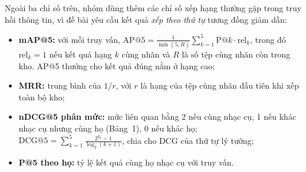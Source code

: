 
Ngoài ba chỉ số trên, nhóm dùng thêm các chỉ số xếp hạng thường gặp trong truy hồi thông tin, vì đề bài yêu cầu kết quả \emph{xếp theo thứ tự} tương đồng giảm dần:
\begin{itemize}
\item \textbf{mAP@5:} với mỗi truy vấn, $\mathrm{AP@5}=\frac{1}{\min(5,R)}\sum_{k=1}^{5}\mathrm{P@}k\cdot \mathrm{rel}_k$, trong đó $\mathrm{rel}_k=1$ nếu kết quả hạng $k$ cùng nhãn và $R$ là số tệp cùng nhãn còn trong kho. AP@5 thưởng cho kết quả đúng nằm ở hạng cao;
\item \textbf{MRR:} trung bình của $1/r$, với $r$ là hạng của tệp cùng nhãn đầu tiên khi xếp toàn bộ kho;
\item \textbf{nDCG@5 phân mức:} mức liên quan bằng 2 nếu cùng nhạc cụ, 1 nếu khác nhạc cụ nhưng cùng họ (Bảng~1), 0 nếu khác họ; $\mathrm{DCG@5}=\sum_{k=1}^{5}\frac{2^{g_k}-1}{\log_2(k+1)}$, chia cho DCG của thứ tự lý tưởng;
\item \textbf{P@5 theo họ:} tỷ lệ kết quả cùng họ nhạc cụ với truy vấn.
\end{itemize}

